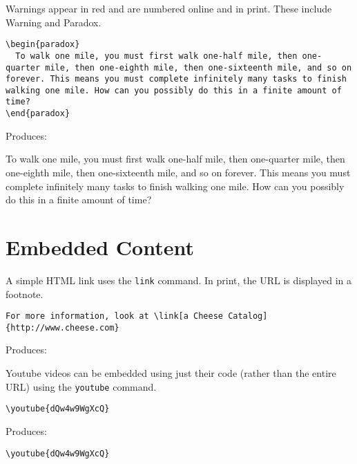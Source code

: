 \documentclass{ximera}
\begin{document}
\begin{example} Warnings appear in red and are numbered online and in print. These include Warning and Paradox.

\begin{verbatim}
\begin{paradox}
  To walk one mile, you must first walk one-half mile, then one-quarter mile, then one-eighth mile, then one-sixteenth mile, and so on forever. This means you must complete infinitely many tasks to finish walking one mile. How can you possibly do this in a finite amount of time?
\end{paradox}
\end{verbatim}

Produces:

\begin{paradox}
  To walk one mile, you must first walk one-half mile, then one-quarter mile, then one-eighth mile, then one-sixteenth mile, and so on forever. This means you must complete infinitely many tasks to finish walking one mile. How can you possibly do this in a finite amount of time?
\end{paradox}
\end{example}

\section{Embedded Content} \label{EmbeddedContent}

\begin{example} A simple HTML link uses the \verb!link! command. In print, the URL is displayed in a footnote.

\begin{verbatim}
For more information, look at \link[a Cheese Catalog]{http://www.cheese.com}
\end{verbatim}

Produces:

\end{example}

\begin{example} Youtube videos can be embedded using just their code (rather than the entire URL) using the \verb!youtube! command.

\begin{verbatim}
\youtube{dQw4w9WgXcQ}
\end{verbatim}

Produces:

\begin{verbatim}
\youtube{dQw4w9WgXcQ}
\end{verbatim}
\end{example}
\end{document}
